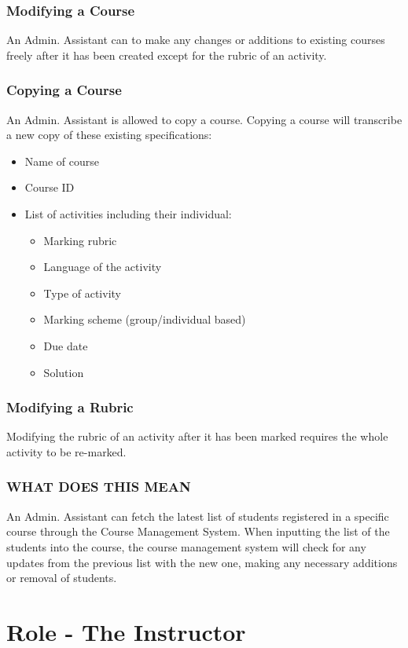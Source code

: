 \documentclass{article}
\begin{document}
\subsubsection{Modifying a Course}
An Admin. Assistant can to make any changes or additions to existing courses
freely after it has been created except for the rubric of an activity.
\subsubsection{Copying a Course}
An Admin. Assistant is allowed to copy a course. Copying a course will transcribe a new copy of these existing specifications:
\begin{itemize}
  \item Name of course
  \item Course ID
  \item List of activities including their individual:
    \begin{itemize}
    \item Marking rubric
    \item Language of the activity
    \item Type of activity
    \item Marking scheme (group/individual based)
    \item Due date
    \item Solution
    \end {itemize}
\end {itemize}
\subsubsection{Modifying a Rubric}
Modifying the rubric of an activity after it has been marked requires the whole
activity to be re-marked.

\subsubsection{WHAT DOES THIS MEAN}
An Admin. Assistant can fetch the latest list of students registered in a
specific course through the Course Management System.
When inputting the list of the students into the course, the course management
system will check for any updates from the previous list with the new one,
making any necessary additions or removal of students.



\section{Role - The Instructor}
\end{document}
